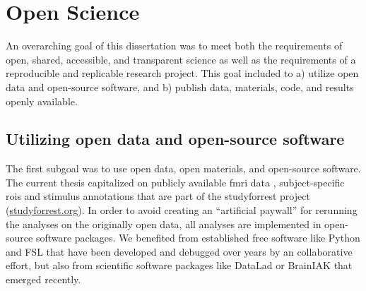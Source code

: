 \section{Open Science}


%
An overarching goal of this dissertation was to meet both the requirements of
open, shared, accessible, and transparent science \citep[cf.][]{watson2015will,
fecher2014open} as well as the requirements of a reproducible and replicable
research project. This goal included to a) utilize open data and open-source
software, and b) publish data, materials, code, and results openly available.


\subsection{Utilizing open data and open-source software}

%
The first subgoal was to use open data, open materials, and open-source
software.
%
The current thesis capitalized on publicly available
%
\ac{fmri} data \citep{hanke2014audiomovie, hanke2016simultaneous,
sengupta2016extension},
%
subject-specific \acp{roi} \citep{sengupta2016extension} and
%
stimulus annotations \citep{haeusler2016cutanno}
%
that are part of the studyforrest project
(\href{www.studyforrest.org}{\url{studyforrest.org}}).
%
In order to avoid creating an ``artificial paywall'' for rerunning the analyses
on the originally open data, all analyses are implemented in open-source
software packages.
%
We benefited from established free software like
%
Python and
%
FSL \citep[\href{https://www.fmrib.ox.ac.uk/fsl}{FMRIB's Software
Library;}][]{smith2004fsl} that have been developed and debugged over years by
an collaborative effort,
%
but also from scientific software packages like
%
DataLad
\citep[\href{www.datalad.org}{\url{datalad.org}};][]{halchenko2021datalad} or
%
BrainIAK
\citep[\href{https://brainiak.org}{\url{brainiak.org}};][]{kumar2020brainiak,
kumar2020brainiaktutorial}
%
that emerged recently.

